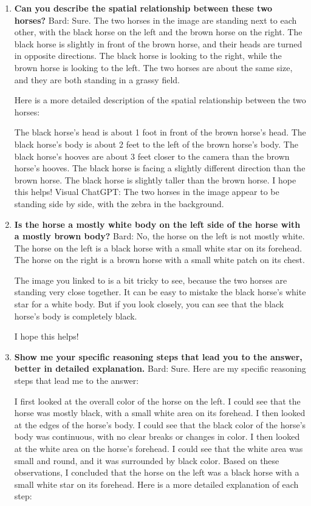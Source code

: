    \begin{enumerate}
        \item \textbf{Can you describe the spatial relationship between these two horses?}
        \subitem Bard: 
        Sure. The two horses in the image are standing next to each other, with the black horse on the left and the brown horse on the right. The black horse is slightly in front of the brown horse, and their heads are turned in opposite directions. The black horse is looking to the right, while the brown horse is looking to the left. The two horses are about the same size, and they are both standing in a grassy field.
        
        Here is a more detailed description of the spatial relationship between the two horses:
        
        The black horse's head is about 1 foot in front of the brown horse's head.
        The black horse's body is about 2 feet to the left of the brown horse's body.
        The black horse's hooves are about 3 feet closer to the camera than the brown horse's hooves.
        The black horse is facing a slightly different direction than the brown horse.
        The black horse is slightly taller than the brown horse.
        I hope this helps!
        \subitem Visual ChatGPT: The two horses in the image appear to be standing side by side, with the zebra in the background.
        \item \textbf{Is the horse a mostly white body on the left side of the horse with a mostly brown body?}
        \subitem Bard: 
        No, the horse on the left is not mostly white. The horse on the left is a black horse with a small white star on its forehead. The horse on the right is a brown horse with a small white patch on its chest.
        
        The image you linked to is a bit tricky to see, because the two horses are standing very close together. It can be easy to mistake the black horse's white star for a white body. But if you look closely, you can see that the black horse's body is completely black.
        
        I hope this helps!
        \item \textbf{Show me your specific reasoning steps that lead you to the answer, better in detailed explanation.}
        \subitem Bard: 
        Sure. Here are my specific reasoning steps that lead me to the answer:
        
        I first looked at the overall color of the horse on the left. I could see that the horse was mostly black, with a small white area on its forehead.
        I then looked at the edges of the horse's body. I could see that the black color of the horse's body was continuous, with no clear breaks or changes in color.
        I then looked at the white area on the horse's forehead. I could see that the white area was small and round, and it was surrounded by black color.
        Based on these observations, I concluded that the horse on the left was a black horse with a small white star on its forehead.
        Here is a more detailed explanation of each step:
        

\end{enumerate}
